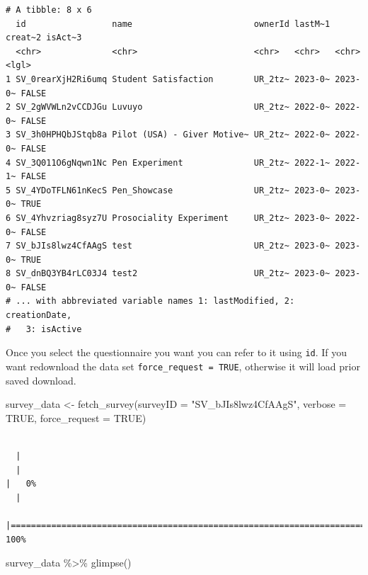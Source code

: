 \documentclass[
  letterpaper,
]{book}
\newenvironment{Shaded}{\begin{snugshade}}{\end{snugshade}}
\newcommand{\AttributeTok}[1]{\textcolor[rgb]{0.40,0.45,0.13}{#1}}
\newcommand{\ConstantTok}[1]{\textcolor[rgb]{0.56,0.35,0.01}{#1}}
\newcommand{\FunctionTok}[1]{\textcolor[rgb]{0.28,0.35,0.67}{#1}}
\newcommand{\NormalTok}[1]{\textcolor[rgb]{0.00,0.23,0.31}{#1}}
\newcommand{\OtherTok}[1]{\textcolor[rgb]{0.00,0.23,0.31}{#1}}
\newcommand{\SpecialCharTok}[1]{\textcolor[rgb]{0.37,0.37,0.37}{#1}}
\newcommand{\StringTok}[1]{\textcolor[rgb]{0.13,0.47,0.30}{#1}}
\begin{document}
\begin{verbatim}
# A tibble: 8 x 6
  id                 name                        ownerId lastM~1 creat~2 isAct~3
  <chr>              <chr>                       <chr>   <chr>   <chr>   <lgl>  
1 SV_0rearXjH2Ri6umq Student Satisfaction        UR_2tz~ 2023-0~ 2023-0~ FALSE  
2 SV_2gWVWLn2vCCDJGu Luvuyo                      UR_2tz~ 2022-0~ 2022-0~ FALSE  
3 SV_3h0HPHQbJStqb8a Pilot (USA) - Giver Motive~ UR_2tz~ 2022-0~ 2022-0~ FALSE  
4 SV_3Q011O6gNqwn1Nc Pen Experiment              UR_2tz~ 2022-1~ 2022-1~ FALSE  
5 SV_4YDoTFLN61nKecS Pen_Showcase                UR_2tz~ 2023-0~ 2023-0~ TRUE   
6 SV_4Yhvzriag8syz7U Prosociality Experiment     UR_2tz~ 2023-0~ 2022-0~ FALSE  
7 SV_bJIs8lwz4CfAAgS test                        UR_2tz~ 2023-0~ 2023-0~ TRUE   
8 SV_dnBQ3YB4rLC03J4 test2                       UR_2tz~ 2023-0~ 2023-0~ FALSE  
# ... with abbreviated variable names 1: lastModified, 2: creationDate,
#   3: isActive
\end{verbatim}

Once you select the questionnaire you want you can refer to it using
\texttt{id}. If you want redownload the data set
\texttt{force\_request\ =\ TRUE}, otherwise it will load prior saved
download.

\begin{Shaded}
\begin{Highlighting}[]
\NormalTok{survey\_data }\OtherTok{\textless{}{-}} \FunctionTok{fetch\_survey}\NormalTok{(}\AttributeTok{surveyID =} \StringTok{"SV\_bJIs8lwz4CfAAgS"}\NormalTok{, }
             \AttributeTok{verbose =} \ConstantTok{TRUE}\NormalTok{,}
             \AttributeTok{force\_request =} \ConstantTok{TRUE}\NormalTok{)}
\end{Highlighting}
\end{Shaded}

\begin{verbatim}

  |                                                                            
  |                                                                      |   0%
  |                                                                            
  |======================================================================| 100%
\end{verbatim}

\begin{Shaded}
\begin{Highlighting}[]
\NormalTok{survey\_data }\SpecialCharTok{\%\textgreater{}\%} \FunctionTok{glimpse}\NormalTok{()}
\end{Highlighting}
\end{Shaded}
\end{document}
